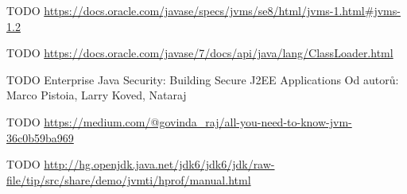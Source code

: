 \begin{literatura}{99}
    TODO \url{https://docs.oracle.com/javase/specs/jvms/se8/html/jvms-1.html#jvms-1.2}

    TODO \url{https://docs.oracle.com/javase/7/docs/api/java/lang/ClassLoader.html}

    TODO Enterprise Java Security: Building Secure J2EE Applications
    Od autorů: Marco Pistoia, Larry Koved, Nataraj 

    TODO \url{https://medium.com/@govinda_raj/all-you-need-to-know-jvm-36c0b59ba969}

    TODO \url{http://hg.openjdk.java.net/jdk6/jdk6/jdk/raw-file/tip/src/share/demo/jvmti/hprof/manual.html}

\end{literatura}